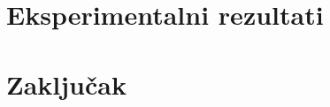 \documentclass[12pt,oneside]{memoir}
\begin{document}
\chapter{Eksperimentalni rezultati}
\label{chp:rezultati}


\newpage




\chapter{Zaključak}
\label{chp:zakljucak}


\newpage


\literatura

\backmatter
\end{document}
